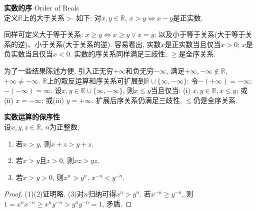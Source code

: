 \begin{dfn}\textbf{实数的序} Order of Reals\\
定义$\mathbb{R}$上的大于关系$>$ 如下: 对$x,y \in \mathbb{R}$, $x>y \iff x-y$是正实数. 
\end{dfn}
\par 同样可定义大于等于关系: $x\ge y \iff x\ge y \lor x=y$; 以及小于等于关系(大于等于关系的逆)、小于关系(大于关系的逆). 容易看出, 实数$x$是正实数当且仅当$x>0$; $x$是负实数当且仅当$x<0$. 实数的序关系同样满足三歧性, $\ge$是全序关系. 

\par 为了一些结果陈述方便, 引入正无穷$+\infty$和负无穷$-\infty$, 满足$+\infty, -\infty \notin \mathbb{R}$, $+\infty \neq -\infty$. $\mathbb{R}$上的取反运算和序关系可扩展到$\mathbb{R}\cup \{\infty, -\infty\}$: 令$-(+\infty)=-\infty$; $-(-\infty)=\infty$. 设$x,y \in \mathbb{R}\cup \{\infty, -\infty\}$, 则$x\le y$当且仅当: (i) $x,y\in \mathbb{R}, x\le y$; 或(ii) $x=-\infty$; 或(iii) $y=+\infty$. 扩展后序关系仍满足三歧性, $\le$仍是全序关系. 

\begin{pro}\textbf{实数运算的保序性}\\
设$x,y,z \in \mathbb{R}$, $n$为正整数,  
\begin{enumerate}
\item 若$x>y$, 则$x+z>y+z$.
\item 若$x>y$且$z>0$, 则$xz>yz$. 
\item 若$x>y>0$, 则$x^n>y^n$, $x^{-n}<y^{-n}$.
\end{enumerate}
\end{pro}
\begin{proof}
(1)(2)证明略. (3)对$n$归纳可得$x^n>y^n$. 若$x^{-n}\ge y^{-n}$, 则$1=x^nx^{-n}\ge x^ny^{-n}>y^ny^{-n}=1$, 矛盾. 
\end{proof}

